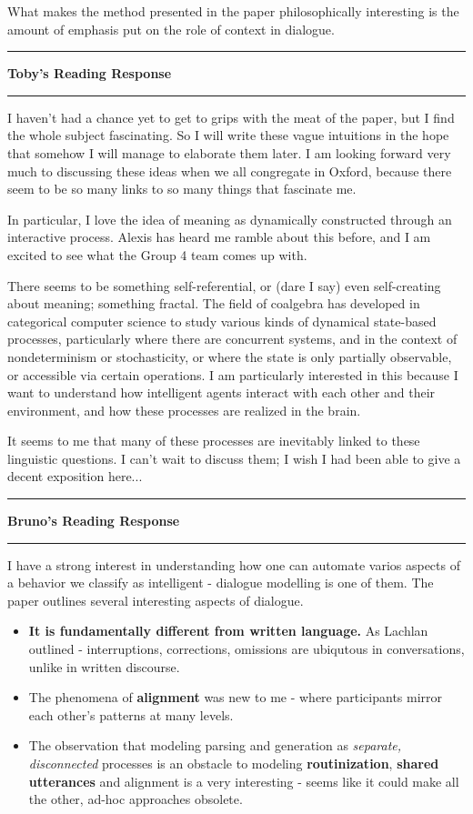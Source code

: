 \documentclass{amsart}
\newcommand{\iam}[1]{
  \vspace{0.25em}
  \hrule
  \vspace{0.25em}
  \textbf{{#1}'s Reading Response}
  \vspace{0.25em}
  \hrule
  \vspace{1em}
}
\begin{document}
What makes the method presented in the paper philosophically interesting is the amount of emphasis put on the role of context in dialogue.

\iam{Toby}

I haven't had a chance yet to get to grips with the meat of the paper, but I
find the whole subject fascinating. So I will write these vague intuitions in
the hope that somehow I will manage to elaborate them later. I am looking
forward very much to discussing these ideas when we all congregate in Oxford,
because there seem to be so many links to so many things that fascinate me.

In particular, I love the idea of meaning as dynamically constructed through an
interactive process. Alexis has heard me ramble about this before, and I am
excited to see what the Group 4 team comes up with.

There seems to be something self-referential, or (dare I say) even self-creating
about meaning; something fractal. The field of coalgebra has developed in
categorical computer science to study various kinds of dynamical state-based
processes, particularly where there are concurrent systems, and in the context
of nondeterminism or stochasticity, or where the state is only partially
observable, or accessible via certain operations. I am particularly interested
in this because I want to understand how intelligent agents interact with each
other and their environment, and how these processes are realized in the brain.

It seems to me that many of these processes are inevitably linked to these
linguistic questions. I can't wait to discuss them; I wish I had been able to
give a decent exposition here...


\iam{Bruno}

I have a strong interest in understanding how one can automate varios aspects of
a behavior we classify as intelligent - dialogue modelling is one of them.
The paper outlines several interesting aspects of dialogue.
\begin{itemize}
\item \textbf{It is fundamentally different from written language.} As Lachlan
  outlined - interruptions, corrections, omissions are ubiqutous in
  conversations, unlike in written discourse.
\item The phenomena of \textbf{alignment} was new to me - where participants mirror each
  other's patterns at many levels.
\item The observation that modeling parsing and generation as \textit{separate,
  disconnected} processes is an obstacle to modeling \textbf{routinization}, \textbf{shared
utterances} and alignment is a very interesting - seems like it could make all
the other, ad-hoc approaches obsolete.
\end{itemize}
\end{document}
